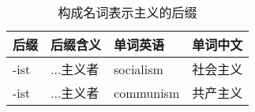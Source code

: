 \documentclass[UTF8]{ctexart}
\begin{document}
    \begin{table}[h!]
        \begin{center}
            \ttfamily
            \begin{tabular}{p{40pt}|p{80pt}|p{80pt}|p{80pt}}
                \hline
                后缀&后缀含义&单词英语&单词中文\\ \hline
                -ist&...主义者&socialism&社会主义\\ \hline
                -ist&...主义者&communism&共产主义\\ \hline
            \end{tabular}
            \rmfamily
            \caption{构成名词表示主义的后缀}
        \end{center}
    \end{table}

\newpage
\end{document}
